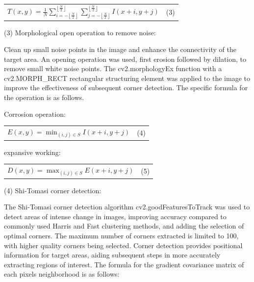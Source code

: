 \documentclass[
]{article}
\newcounter{none} %
\begin{document}
{\def\LTcaptype{none} %
\begin{longtable}[]{@{}
  >{\raggedright\arraybackslash}p{}
  >{\centering\arraybackslash}p{}@{}}
\toprule\noalign{}
\endhead
\bottomrule\noalign{}
\endlastfoot
\(T(x,y) = \frac{1}{N}\sum_{i = - \left\lfloor \frac{N}{2} \right\rfloor}^{\left\lfloor \frac{N}{2} \right\rfloor}{\sum_{j = - \left\lfloor \frac{N}{2} \right\rfloor}^{\left\lfloor \frac{N}{2} \right\rfloor}{I(x + i,y + j)}}\)
& (3) \\
\end{longtable}
}

(3) Morphological open operation to remove noise:

Clean up small noise points in the image and enhance the connectivity of
the target area. An opening operation was used, first erosion followed
by dilation, to remove small white noise points. The cv2.morphologyEx
function with a cv2.MORPH\_RECT rectangular structuring element was
applied to the image to improve the effectiveness of subsequent corner
detection. The specific formula for the operation is as follows.

Corrosion operation:

{\def\LTcaptype{none} %
\begin{longtable}[]{@{}
  >{\raggedright\arraybackslash}p{}
  >{\centering\arraybackslash}p{}@{}}
\toprule\noalign{}
\endhead
\bottomrule\noalign{}
\endlastfoot
\(E(x,y) = \min_{(i,j) \in S}I(x + i,y + j)\) & (4) \\
\end{longtable}
}

expansive working:

{\def\LTcaptype{none} %
\begin{longtable}[]{@{}
  >{\raggedright\arraybackslash}p{}
  >{\centering\arraybackslash}p{}@{}}
\toprule\noalign{}
\endhead
\bottomrule\noalign{}
\endlastfoot
\(D(x,y) = \max_{(i,j) \in S}E(x + i,y + j)\) & (5) \\
\end{longtable}
}

(4) Shi-Tomasi corner detection:

The Shi-Tomasi corner detection algorithm cv2.goodFeaturesToTrack was
used to detect areas of intense change in images, improving accuracy
compared to commonly used Harris and Fast clustering methods, and adding
the selection of optimal corners. The maximum number of corners
extracted is limited to 100, with higher quality corners being selected.
Corner detection provides positional information for target areas,
aiding subsequent steps in more accurately extracting regions of
interest. The formula for the gradient covariance matrix of each
pixel\textquotesingle s neighborhood is as follows:
\end{document}
